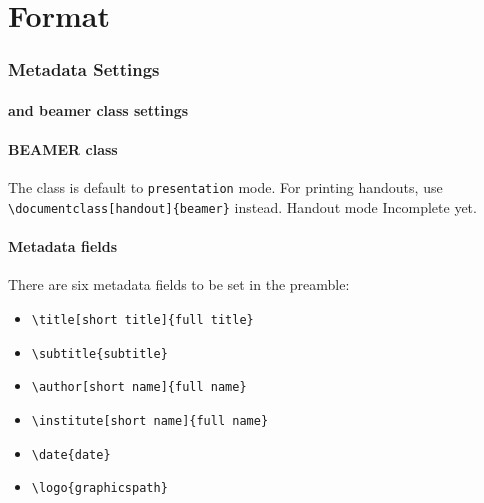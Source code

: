 \section{Format} 

\begin{frame}
  \frametitle{Metadata Settings}
  \framesubtitle{and beamer class settings}
  
  \paragraph{BEAMER class}
  The class is default to \Verb|presentation| mode. 
  For printing handouts, use \Verb|\documentclass[handout]{beamer}| instead. 
  \alert{Handout mode Incomplete yet.}

  \paragraph{Metadata fields}
  There are six metadata fields to be set in the preamble:
  \begin{itemize}
    \item \Verb|\title[short title]{full title}|
    \item \Verb|\subtitle{subtitle}|
    \item \Verb|\author[short name]{full name}|
    \item \Verb|\institute[short name]{full name}|
    \item \Verb|\date{date}|
    \item \Verb|\logo{graphicspath}|
  \end{itemize}
\end{frame}

